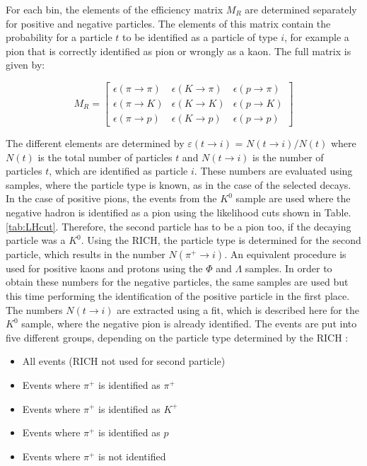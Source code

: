 For each bin, the elements of the efficiency matrix $M_R$ are determined separately for positive and negative particles. The elements of this matrix contain the probability for a particle $t$ to be identified as a particle of type $i$, for example a pion that is correctly identified as pion or wrongly as a kaon. The full matrix is given by:

\begin{equation}
  M_R
  =
  \begin{bmatrix}
  \epsilon(\pi \rightarrow \pi) & \epsilon(K \rightarrow \pi) & \epsilon(p \rightarrow \pi)\\
  \epsilon(\pi \rightarrow K) & \epsilon(K \rightarrow K) & \epsilon(p \rightarrow K) \\
  \epsilon(\pi \rightarrow p) & \epsilon(K \rightarrow p) & \epsilon(p \rightarrow p)
  \end{bmatrix}
\end{equation}

The different elements are determined by $\varepsilon(t \rightarrow i)$ = $N(t \rightarrow i)/N(t)$ where $N(t)$ is the total number of particles $t$ and $N(t \rightarrow i)$ is the number of particles $t$, which are identified as particle $i$. These numbers are evaluated using samples, where the particle type is known, as in the case of the selected decays. In the case of positive pions, the events from the $K^0$ sample are used where the negative hadron is identified as a pion using the likelihood cuts shown in Table. \ref{tab:LHcut}.  Therefore, the second particle has to be a pion too, if the decaying particle was a $K^0$. Using the RICH, the particle type is determined for the second particle, which  results in the number $N(\pi^+ \rightarrow i)$. An equivalent procedure is used for positive kaons and protons using the $\Phi$ and $\Lambda$ samples. In order to obtain these numbers for the negative particles, the same samples are used but this time performing the identification of the positive particle in the first place. The numbers $N(t \rightarrow i)$ are extracted using a fit, which is described here for the $K^0$ sample, where the negative pion is already identified. The events are put into five different groups, depending on the particle type determined by the RICH :

\begin{itemize}
  \item All events (RICH not used for second particle)
  \item Events where $\pi^+$ is identified as $\pi^+$
  \item Events where $\pi^+$ is identified as $K^+$
  \item Events where $\pi^+$ is identified as $p$
  \item Events where $\pi^+$ is not identified
\end{itemize}

